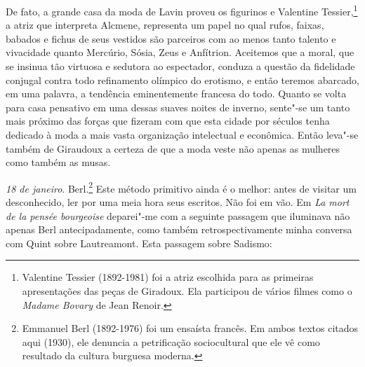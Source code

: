 De fato, a grande casa da moda de Lavin proveu os figurinos e Valentine
Tessier,\footnote{Valentine Tessier (1892-1981) foi a atriz
  escolhida para as primeiras apresentações das peças de Giradoux. Ela
  participou de vários filmes como o \emph{Madame Bovary} de Jean
  Renoir. \versal{[N. E.]}} a atriz que interpreta Alcmene, representa um papel no qual
rufos, faixas, babados e fichus de seus vestidos são parceiros com ao
menos tanto talento e vivacidade quanto Mercúrio, Sósia, Zeus e
Anfítrion. Aceitemos que a moral, que se insinua tão virtuosa e sedutora
ao espectador, conduza a questão da fidelidade conjugal contra todo
refinamento olímpico do erotismo, e então teremos abarcado, em uma
palavra, a tendência eminentemente francesa do todo. Quanto se volta
para casa pensativo em uma dessas suaves noites de inverno, sente"-se um
tanto mais próximo das forças que fizeram com que esta cidade por
séculos tenha dedicado à moda a mais vasta organização intelectual e
econômica. Então leva"-se também de Giraudoux a certeza de que a moda
veste não apenas as mulheres como também as musas.

\emph{18 de janeiro}. Berl.\footnote{Emmanuel Berl (1892-1976) foi um
  ensaísta francês. Em ambos textos citados aqui (1930), ele denuncia a
  petrificação sociocultural que ele vê como resultado da cultura
  burguesa moderna. \versal{[N. E.]}} Este método primitivo ainda é o melhor: antes de
visitar um desconhecido, ler por uma meia hora seus escritos. Não foi em
vão. Em \emph{La mort de la pensée bourgeoise} deparei"-me com a seguinte
passagem que iluminava não apenas Berl antecipadamente, como também
retrospectivamente minha conversa com Quint sobre Lautreamont. Esta
passagem sobre Sadismo:

